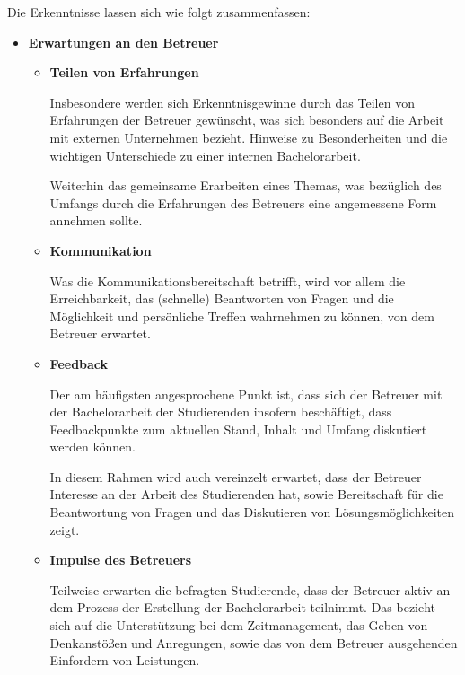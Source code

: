 \documentclass{scrreprt}
\begin{document}
\par Die Erkenntnisse lassen sich wie folgt zusammenfassen:
\begin{itemize}

\item \textbf{Erwartungen an den Betreuer}
\begin{itemize}

\item \textbf{Teilen von Erfahrungen}
\par Insbesondere werden sich Erkenntnisgewinne durch das Teilen von Erfahrungen der Betreuer gewünscht, was sich besonders auf die Arbeit mit externen Unternehmen bezieht. Hinweise zu Besonderheiten und die wichtigen Unterschiede zu einer internen Bachelorarbeit. 
\par Weiterhin das gemeinsame Erarbeiten eines Themas, was bezüglich des Umfangs durch die Erfahrungen des Betreuers eine angemessene Form annehmen sollte.\\

\item \textbf{Kommunikation}
\par Was die Kommunikationsbereitschaft betrifft, wird vor allem die Erreichbarkeit, das (schnelle) Beantworten von Fragen und die Möglichkeit und persönliche Treffen wahrnehmen zu können, von dem Betreuer erwartet.\\

\item \textbf{Feedback}
\par Der am häufigsten angesprochene Punkt ist, dass sich der Betreuer mit der Bachelorarbeit der Studierenden insofern beschäftigt, dass Feedbackpunkte zum aktuellen Stand, Inhalt und Umfang diskutiert werden können.
\par In diesem Rahmen wird auch vereinzelt erwartet, dass der Betreuer Interesse an der Arbeit des Studierenden hat, sowie Bereitschaft für die Beantwortung von Fragen und das Diskutieren von Lösungsmöglichkeiten zeigt.\\

\item \textbf{Impulse des Betreuers}
\par Teilweise erwarten die befragten Studierende, dass der Betreuer aktiv an dem Prozess der Erstellung der Bachelorarbeit teilnimmt. Das bezieht sich auf die Unterstützung bei dem Zeitmanagement, das Geben von Denkanstößen und Anregungen, sowie das von dem Betreuer ausgehenden Einfordern von Leistungen.\\
\end{itemize}


\end{itemize}
\end{document}
